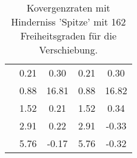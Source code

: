 \begin{table}
\begin{tabular}{c|cc|cc|}
\multicolumn{1}{|c|}{} & \multicolumn{1}{|c|}{      0.21} & \multicolumn{1}{|c|}{      0.30} & \multicolumn{1}{|c|}{      0.21} & \multicolumn{1}{|c|}{      0.30} \\ 
\multicolumn{1}{|c|}{} & \multicolumn{1}{|c|}{      0.88} & \multicolumn{1}{|c|}{     16.81} & \multicolumn{1}{|c|}{      0.88} & \multicolumn{1}{|c|}{     16.82} \\ 
\multicolumn{1}{|c|}{} & \multicolumn{1}{|c|}{      1.52} & \multicolumn{1}{|c|}{      0.21} & \multicolumn{1}{|c|}{      1.52} & \multicolumn{1}{|c|}{      0.34} \\ 
\multicolumn{1}{|c|}{} & \multicolumn{1}{|c|}{      2.91} & \multicolumn{1}{|c|}{      0.22} & \multicolumn{1}{|c|}{      2.91} & \multicolumn{1}{|c|}{     -0.33} \\ 
\multicolumn{1}{|c|}{} & \multicolumn{1}{|c|}{      5.76} & \multicolumn{1}{|c|}{     -0.17} & \multicolumn{1}{|c|}{      5.76} & \multicolumn{1}{|c|}{     -0.32} \\ 
\hline 
\end{tabular}\caption{Kovergenzraten mit Hinderniss 'Spitze' mit 162 Freiheitsgraden für die Verschiebung.}\label{tab:Rate_Spitze_level2}
\end{table} 
